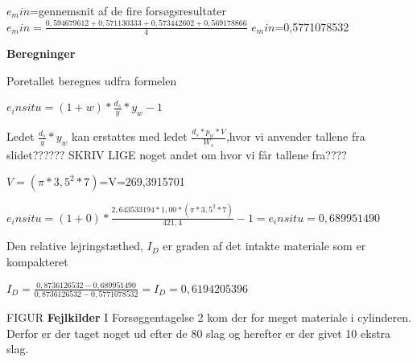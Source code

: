 $e_min$=gennemsnit af de fire forsøgsresultater
$e_min=\frac{0,594679612+0,571130333+0,573442602+0,569178866}{4}$
$e_min$=0,5771078532

\textbf{Beregninger}
\newline

Poretallet beregnes udfra formelen
\begin{center}
	$e_insitu=(1+w)*\frac{d_s}{y}*y_w-1$
\end{center}

Ledet $\frac{d_s}{y}*y_w$ kan erstattes med ledet $\frac{d_s*p_w*V}{W_s}$,hvor vi anvender tallene fra slidet?????? SKRIV LIGE noget andet om hvor vi får tallene fra????
\begin{center}
	$V=(\pi*3,5^2*7)$=V=269,3915701
\end{center}
\begin{center}
	$e_insitu=(1+0)*\frac{2,643533194*1,00*(\pi*3,5^2*7)}{421,4}-1=e_insitu=0,689951490$
\end{center}

Den relative lejringstæthed, $I_D$ er graden af det intakte materiale som er kompakteret
\begin{center}
	$I_D=\frac{0,8736126532-0,689951490}{0,8736126532-0,5771078532}=I_D=0,6194205396$
\end{center}

FIGUR
\newline
\newline
\textbf{Fejlkilder}
I Forsøggentagelse 2 kom der for meget materiale i cylinderen. Derfor er der taget noget ud efter de 80 slag og herefter er der givet 10 ekstra slag. 
